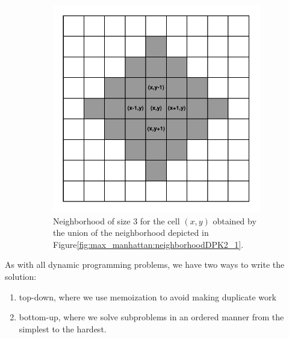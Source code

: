 \begin{figure}
    \begin{subfigure}[t]{0.4\textwidth}
        \centering
        \includegraphics[width=\textwidth]{sources/max_manhattan/images/neighborhoodDPK2_2}
        \caption[]{Neighborhood of size $3$ for the cell $(x,y)$ obtained by the union of the
        neighborhood depicted in Figure\ref{fig:max_manhattan:neighborhoodDPK2_1}.}
        \label{fig:max_manhattan:neighborhoodDPK2_2}
     \end{subfigure}
     \label{}
     \caption{}
\end{figure}


As with all dynamic programming problems, we have two ways to write the solution:
\begin{enumerate}
    \item top-down, where we use memoization to avoid making duplicate work
    \item bottom-up, where we solve subproblems in an ordered manner from the simplest to the
    hardest.
\end{enumerate}

